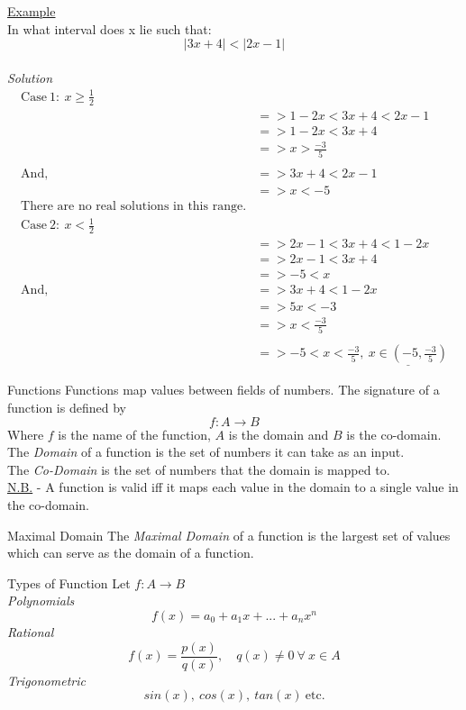 \documentclass[11pt,a4paper]{article}
\begin{document}
\underline{Example} \\
In what interval does x lie such that: $$|3x+4|<|2x-1|$$ \\
\textit{Solution}
\begin{align*}
  \mathrm{Case\ 1:}\ x \geq \frac{1}{2} & \\
  &=> 1 - 2x < 3x + 4 < 2x - 1 \\
  &=> 1 - 2x < 3x + 4 \\
  &=> x > \frac{-3}{5} \\ \\
  \mathrm{And,} &=> 3x + 4 < 2x - 1 \\
  &=> x < -5 \\
  \text{There are no real solutions in this range.} \\
  \mathrm{Case\ 2:}\ x < \frac{1}{2} & \\
  &=> 2x - 1 < 3x + 4 < 1 -2x \\
  &=> 2x - 1 < 3x + 4 \\
  &=> -5 < x \\
  \mathrm{And,} &=> 3x + 4 < 1 - 2x \\
  &=> 5x < -3 \\
  &=> x < \frac{-3}{5} \\
  \\ &=>-5 < x < \frac{-3}{5},\ \underline{ x \in \left(-5,\frac{-3}{5}\right) }
\end{align*}

\subtitle{Definition 1.04 - }{Functions}
Functions map values between fields of numbers. The signature of a function is defined by $$f : A \to B$$
Where $f$ is the name of the function, $A$ is the domain and $B$ is the co-domain. \\
The \textit{Domain} of a function is the set of numbers it can take as an input. \\
The \textit{Co-Domain} is the set of numbers that the domain is mapped to. \\

\underline{N.B.} - A function is valid iff it maps each value in the domain to a single value in the co-domain. \\

\subtitle{Definition 1.05 - }{Maximal Domain}
The \textit{Maximal Domain} of a function is the largest set of values which can serve as the domain of a function. \\

\subtitle{Remark 1.06 - }{Types of Function}
Let $f:A \to B$ \\
\textit{Polynomials} $$f(x) = a_0 + a_1x + ... +a_nx^n$$
\textit{Rational} $$f(x) = \frac{p(x)}{q(x)},\quad q(x) \not = 0\ \forall\ x \in A$$
\textit{Trigonometric} $$sin(x),\ cos(x),\ tan(x)\ \mathrm{etc.}$$
%
\end{document}
